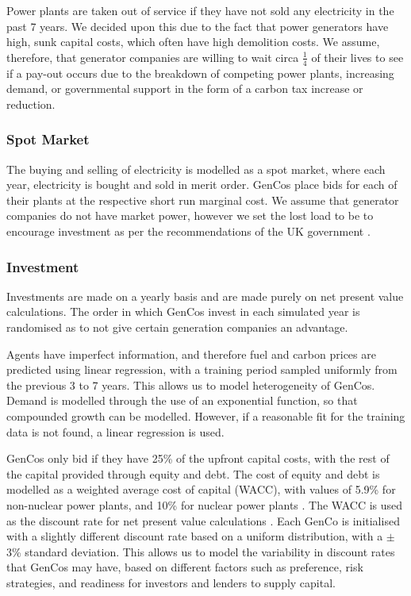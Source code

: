Power plants are taken out of service if they have not sold any electricity in the past 7 years. We decided upon this due to the fact that power generators have high, sunk capital costs, which often have high demolition costs. We assume, therefore, that generator companies are willing to wait circa $\frac{1}{4}$ of their lives to see if a pay-out occurs due to the breakdown of competing power plants, increasing demand, or governmental support in the form of a carbon tax increase or reduction.


\subsubsection{Spot Market}

The buying and selling of electricity is modelled as a spot market, where each year, electricity is bought and sold in merit order. GenCos place bids for each of their plants at the respective short run marginal cost. We assume that generator companies do not have market power, however we set the lost load to be  to encourage investment as per the recommendations of the UK government \cite{DECC2013}.

\subsubsection{Investment}

Investments are made on a yearly basis and are made purely on net present value calculations. The order in which GenCos invest in each simulated year is randomised as to not give certain generation companies an advantage.

Agents have imperfect information, and therefore fuel and carbon prices are predicted using linear regression, with a training period sampled uniformly from the previous 3 to 7 years. This allows us to model heterogeneity of GenCos. Demand is modelled through the use of an exponential function, so that compounded growth can be modelled. However, if a reasonable fit for the training data is not found, a linear regression is used.

GenCos only bid if they have 25\% of the upfront capital costs, with the rest of the capital provided through equity and debt. The cost of equity and debt is modelled as a weighted average cost of capital (WACC), with values of 5.9\% for non-nuclear power plants, and 10\% for nuclear power plants \cite{KPMG2017, Paper2012}. The WACC is used as the discount rate for net present value calculations \cite{KincheloeStephenC1990TWAC}. Each GenCo is initialised with a slightly different discount rate based on a uniform distribution, with a $\pm$3\% standard deviation. This allows us to model the variability in discount rates that GenCos may have, based on different factors such as preference, risk strategies, and readiness for investors and lenders to supply capital.

